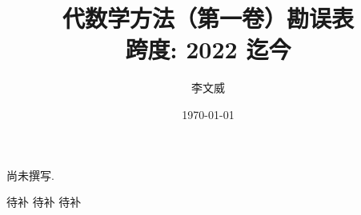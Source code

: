 \documentclass{AJerrata}
\title{\bfseries 代数学方法（第一卷）勘误表 \\ 跨度: 2022 迄今 }
\author{李文威}
\date{\today}
\begin{document}
	\maketitle
	尚未撰写.

	\begin{Errata}
		\item[待补]
		\Orig 待补
		\Corr 待补
	\end{Errata}
\end{document}
